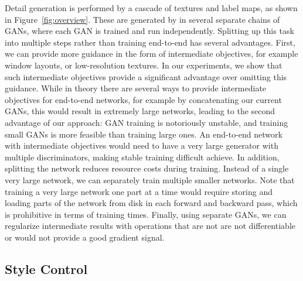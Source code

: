 Detail generation is performed by a cascade of textures and label maps, as shown in Figure~\ref{fig:overview}. These are generated by \systemName in several separate chains of GANs, where each GAN is trained and run independently. Splitting up this task into multiple steps rather than training end-to-end has several advantages. First, we can provide more guidance in the form of intermediate objectives, for example window layouts, or low-resolution textures. In our experiments, we show that such intermediate objectives provide a significant advantage over omitting this guidance. While in theory there are several ways to provide intermediate objectives for end-to-end networks, for example by concatenating our current GANs, this would result in extremely large networks, leading to the second advantage of our approach: GAN training is notoriously unstable, and training small GANs is more feasible than training large ones. An end-to-end network with intermediate objectives would need to have a very large generator with multiple discriminators, making stable training difficult achieve. In addition, splitting the network reduces resource costs during training. Instead of a single very large network, we can separately train multiple smaller networks. Note that training a very large network one part at a time
would require storing and loading parts of the network from disk in each forward and backward pass, which is prohibitive in terms of training times. Finally, using separate GANs, we can regularize intermediate results with operations that are not are not differentiable or would not provide a good gradient signal.

\subsection{Style Control}
\label{sec:style_control}


